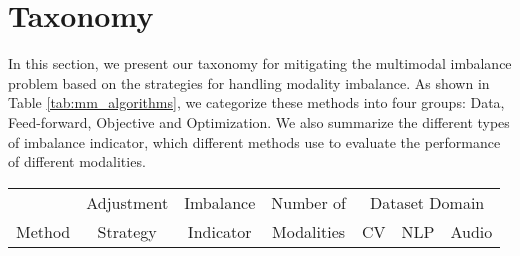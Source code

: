 \section{Taxonomy}
\label{sec:taxonomy}
In this section, we present our taxonomy for mitigating the multimodal imbalance problem based on the strategies for handling modality imbalance. As shown in Table \ref{tab:mm_algorithms}, we categorize these methods into four groups: Data, Feed-forward, Objective and Optimization. We also summarize the different types of imbalance indicator, which different methods use to evaluate the performance of different modalities.

\begin{table*}[t] 
    \centering
    \setlength{\tabcolsep}{5pt}
    \caption{Multimodal imbalance algorithms. \textbf{Adjustment Strategy} refers to different groups of methods in Section \ref{sec:taxonomy}. \textbf{Imbalance Indicator} denotes the metric used to evaluate modality performance. \textbf{Number of Modalities} indicates the maximum number of modalities included in the experiments of the corresponding paper. \textbf{Dataset Domain} refers to the types of modalities included in the corresponding paper.} 
\vspace{-5pt}
\label{tab:mm_algorithms} 
    \begin{tabular}{l|c|c|c|ccc}
        \toprule
        \multicolumn{1}{c}{}            & \multicolumn{1}{c}{Adjustment}       & \multicolumn{1}{c}{Imbalance}         & \multicolumn{1}{c}{Number of}                & \multicolumn{3}{c}{Dataset Domain} \\
        \multicolumn{1}{l}{Method}   & \multicolumn{1}{c}{Strategy}         & \multicolumn{1}{c}{Indicator}    & \multicolumn{1}{c}{Modalities}         & CV & NLP & Audio \\                 
        \midrule
                                                                

\end{tabular}
\end{table*}
